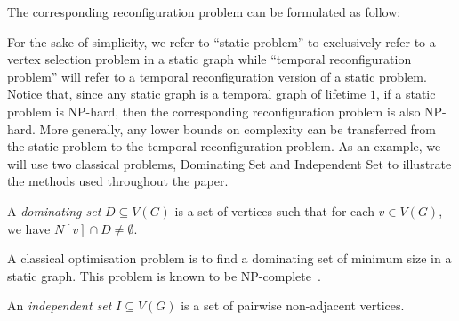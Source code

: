 
\noindent The corresponding reconfiguration problem can be formulated as follow:

 For the sake of simplicity, we refer to ``static problem'' to exclusively refer to a vertex selection problem in a static graph while ``temporal reconfiguration problem'' will refer to a temporal reconfiguration version of a static problem. 
 Notice that, since any static graph is a temporal graph of lifetime $1$, if a static problem is NP-hard, then the corresponding reconfiguration problem is also NP-hard. More generally, any lower bounds on complexity can be transferred from the static problem to the temporal reconfiguration problem.
%
 As an example, we will use two classical problems, {\sc Dominating Set} and {\sc Independent Set} to illustrate the methods used throughout the paper. 

 \begin{exampleB}
   A \emph{dominating set} $D \subseteq V(G)$ is a set of vertices such that for each $v \in V(G)$, we have $N[v] \cap D \neq \emptyset$.
 \end{exampleB}

 
 A classical optimisation problem is to find a dominating set of minimum size in a static graph. This problem is known to be NP-complete~\cite{Garey90}.

 


\begin{exampleB}
An \emph{independent set} $I \subseteq V(G)$ is a set of pairwise non-adjacent vertices.
\end{exampleB}
 
